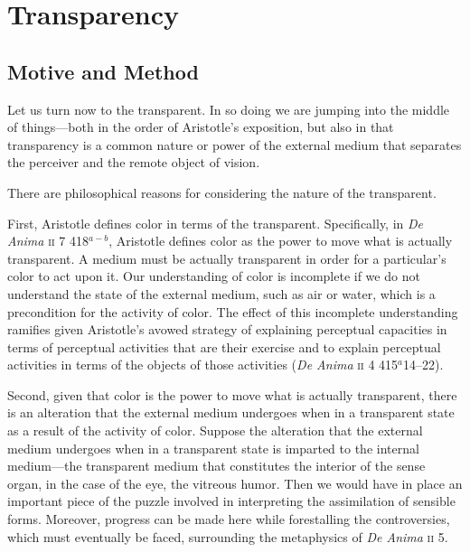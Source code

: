 \chapter{Transparency} %
\label{cha:transparency}

\section{Motive and Method} %
\label{sec:motive_and_method}

Let us turn now to the transparent. In so doing we are jumping into the middle of things---both in the order of Aristotle's exposition, but also in that transparency is a common nature or power of the external medium that separates the perceiver and the remote object of vision.

There are philosophical reasons for considering the nature of the transparent.

First, Aristotle defines color in terms of the transparent. Specifically, in \emph{De Anima} \textsc{ii} 7 418\( ^{a-b} \), Aristotle defines color as the power to move what is actually transparent. A medium must be actually transparent in order for a particular's color to act upon it. Our understanding of color is incomplete if we do not understand the state of the external medium, such as air or water, which is a precondition for the activity of color. The effect of this incomplete understanding ramifies given Aristotle's avowed strategy of explaining perceptual capacities in terms of perceptual activities that are their exercise and to explain perceptual activities in terms of the objects of those activities (\emph{De Anima} \textsc{ii} 4 415\( ^{a} \)14--22).

Second, given that color is the power to move what is actually transparent, there is an alteration that the external medium undergoes when in a transparent state as a result of the activity of color. Suppose the alteration that the external medium undergoes when in a transparent state is imparted to the internal medium---the transparent medium that constitutes the interior of the sense organ, in the case of the eye, the vitreous humor. Then we would have in place an important piece of the puzzle involved in interpreting the assimilation of sensible forms. Moreover, progress can be made here while forestalling the controversies, which must eventually be faced, surrounding the metaphysics of \emph{De Anima} \textsc{ii} 5.

